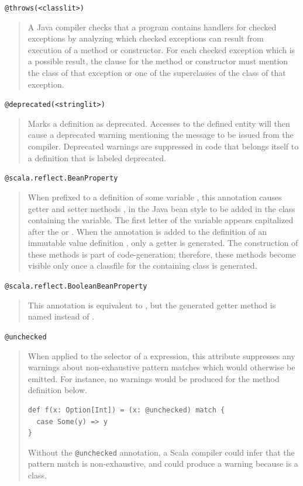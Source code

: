 \lstinline^@throws(<classlit>)^
\begin{quote}
A Java compiler checks that a program contains handlers for checked exceptions
by analyzing which checked exceptions can result from execution of a method or
constructor. For each checked exception which is a possible result, the 
clause for the method or constructor must mention the class of that exception
or one of the superclasses of the class of that exception.
\end{quote}

\lstinline^@deprecated(<stringlit>)^
\begin{quote} Marks a definition as deprecated. Accesses to the
  defined entity will then cause a deprecated warning mentioning the
  message  to be issued from the compiler.  Deprecated
  warnings are suppressed in code that belongs itself to a definition
  that is labeled deprecated.
\end{quote}

\lstinline^@scala.reflect.BeanProperty^
\begin{quote}
When prefixed to a definition of some variable , this
annotation causes getter and setter methods , 
in the Java bean style to be added in the class containing the
variable. The first letter of the variable appears capitalized after
the  or . When the annotation is added to the
definition of an immutable value definition , only a getter is
generated. The construction of these methods is part of
code-generation; therefore, these methods become visible only once a
classfile for the containing class is generated.
\end{quote}

\lstinline^@scala.reflect.BooleanBeanProperty^
\begin{quote}
This annotation is equivalent to , but
the generated getter method is named  instead of .
\end{quote}

\lstinline^@unchecked^
\begin{quote}
When applied to the selector of a \lstinline@match@ expression,
this attribute suppresses any warnings about non-exhaustive pattern
matches which would otherwise be emitted. For instance, no warnings
would be produced for the method definition below.
\begin{lstlisting}
def f(x: Option[Int]) = (x: @unchecked) match {
  case Some(y) => y
}
\end{lstlisting}
Without the \lstinline^@unchecked^ annotation, a Scala compiler could
infer that the pattern match is non-exhaustive, and could produce a
warning because \lstinline@Option@ is a \lstinline@sealed@ class.
\end{quote}

